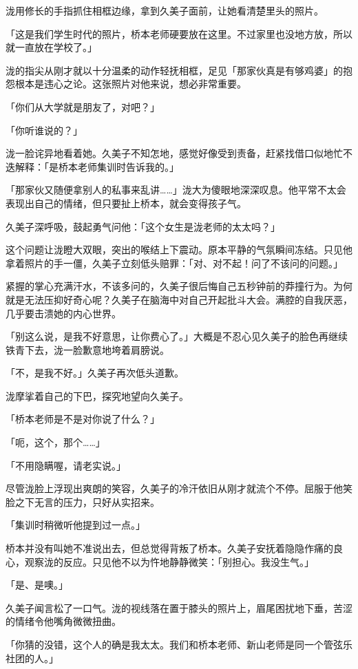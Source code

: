 \documentclass[UTF8]{ctexart}
\begin{document}
    泷用修长的手指抓住相框边缘，拿到久美子面前，让她看清楚里头的照片。 

    「这是我们学生时代的照片，桥本老师硬要放在这里。不过家里也没地方放，所以就一直放在学校了。」 

    泷的指尖从刚才就以十分温柔的动作轻抚相框，足见「那家伙真是有够鸡婆」的抱怨根本是违心之论。这张照片对他来说，想必非常重要。 

    「你们从大学就是朋友了，对吧？」 

    「你听谁说的？」 

    泷一脸诧异地看着她。久美子不知怎地，感觉好像受到责备，赶紧找借口似地忙不迭解释：「是桥本老师集训时告诉我的。」 

    「那家伙又随便拿别人的私事来乱讲……」泷大为傻眼地深深叹息。他平常不太会表现出自己的情绪，但只要扯上桥本，就会变得孩子气。 

    久美子深呼吸，鼓起勇气问他：「这个女生是泷老师的太太吗？」 

    这个问题让泷瞪大双眼，突出的喉结上下震动。原本平静的气氛瞬间冻结。只见他拿着照片的手一僵，久美子立刻低头赔罪：「对、对不起！问了不该问的问题。」 

    紧握的掌心充满汗水，不该多问的，久美子很后悔自己五秒钟前的莽撞行为。为何就是无法压抑好奇心呢？久美子在脑海中对自己开起批斗大会。满腔的自我厌恶，几乎要击溃她的内心世界。 

    「别这么说，是我不好意思，让你费心了。」大概是不忍心见久美子的脸色再继续铁青下去，泷一脸歉意地垮着肩膀说。 

    「不，是我不好。」久美子再次低头道歉。 

    泷摩挲着自己的下巴，探究地望向久美子。 

    「桥本老师是不是对你说了什么？」 

    「呃，这个，那个……」 

    「不用隐瞒喔，请老实说。」 

    尽管泷脸上浮现出爽朗的笑容，久美子的冷汗依旧从刚才就流个不停。屈服于他笑脸之下无言的压力，只好从实招来。 

    「集训时稍微听他提到过一点。」 

    桥本并没有叫她不准说出去，但总觉得背叛了桥本。久美子安抚着隐隐作痛的良心，观察泷的反应。只见他不以为忤地静静微笑：「别担心。我没生气。」 

    「是、是噢。」 

    久美子闻言松了一口气。泷的视线落在置于膝头的照片上，眉尾困扰地下垂，苦涩的情绪令他嘴角微微扭曲。 

    「你猜的没错，这个人的确是我太太。我们和桥本老师、新山老师是同一个管弦乐社团的人。」 
\end{document}
